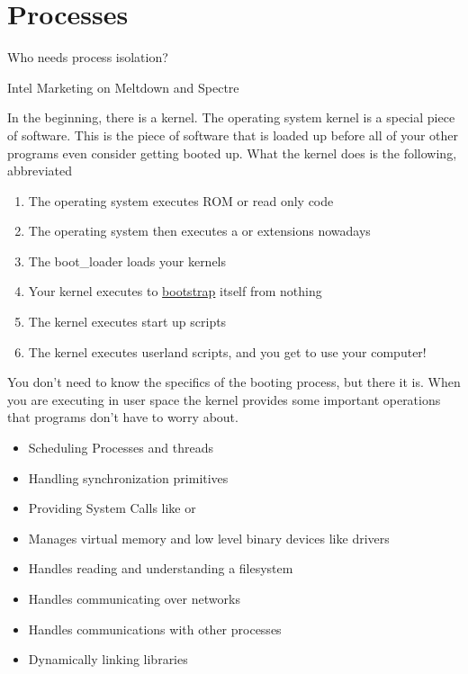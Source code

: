 \chapter{Processes}

\epigraph{Who needs process isolation?}{Intel Marketing on Meltdown and Spectre}

In the beginning, there is a kernel. The operating system kernel is a special piece of software. This is the piece of software that is loaded up before all of your other programs even consider getting booted up. What the kernel does is the following, abbreviated

\begin{enumerate}
  \def\labelenumi{\arabic{enumi}.}
  \tightlist
\item
  The operating system executes ROM or read only code
\item
  The operating system then executes a  or  extensions nowadays
\item
  The boot\_loader loads your kernels
\item
  Your kernel executes  to \href{https://en.wikipedia.org/wiki/Bootstrapping}{bootstrap} itself from nothing
\item
  The kernel executes start up scripts
\item
  The kernel executes userland scripts, and you get to use your computer!
\end{enumerate}

You don't need to know the specifics of the booting process, but there it is.
When you are executing in user space the kernel provides some important operations that programs don't have to worry about. 

\begin{itemize}
\item Scheduling Processes and threads
\item Handling synchronization primitives 
\item Providing System Calls like  or  
\item Manages virtual memory and low level binary devices like  drivers 
\item Handles reading and understanding a filesystem 
\item Handles communicating over networks 
\item Handles communications with other processes 
\item Dynamically linking libraries
\end{itemize}

